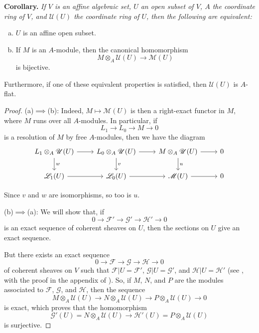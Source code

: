 \documentclass{article}
\newenvironment{itenv}[1]
  {\phantomsection\par\medskip\noindent\textbf{#1.}\itshape}
  {\medskip}
\newcommand{\scr}[1]{{\mathscr{#1}}}
\newcommand{\oldpage}[1]{\marginpar{\footnotesize$\Big\vert$ \textit{p.~#1}}}
\begin{document}
\begin{itenv}{Corollary}
  If $V$ is an affine algebraic set, $U$ an open subset of $V$, $A$ the coordinate ring of $V$, and $\scr{U}(U)$ the coordinate ring of $U$, then the following are equivalent:
  \begin{enumerate}[(a)]
    \item $U$ is an affine open subset.
    \item If $M$ is an $A$-module, then the canonical homomorphism
      \[
        M\otimes_A\scr{U}(U) \to \scr{M}(U)
      \]
      is bijective.
  \end{enumerate}

\oldpage{2-08}
  Furthermore, if one of these equivalent properties is satisfied, then $\scr{U}(U)$ is $A$-flat.
\end{itenv}

\begin{proof}
  (a)$\implies$(b):
  Indeed, $M\mapsto\scr{M}(U)$ is then a right-exact functor in $M$, where $M$ runs over all $A$-modules.
  In particular, if
  \[
    L_1 \to L_0 \to M \to 0
  \]
  is a resolution of $M$ by free $A$-modules, then we have the diagram
  \[
    \begin{tikzcd}
      L_1\otimes_A\scr{U}(U) \rar \dar["w"]
      & L_0\otimes_A\scr{U}(U) \rar \dar["v"]
      & M\otimes_A\scr{U}(U) \rar \dar["u"]
      & 0
    \\\scr{L}_1(U) \rar
      & \scr{L}_0(U) \rar
      & \scr{M}(U) \rar
      & 0
    \end{tikzcd}
  \]

  Since $v$ and $w$ are isomorphisms, so too is $u$.

  \bigskip
  (b)$\implies$(a):
  We will show that, if
  \[
    0 \to \scr{F}' \to\scr{G}' \to \scr{H}' \to 0
  \]
  is an exact sequence of coherent sheaves on $U$, then the sections on $U$ give an exact sequence.

  But there exists an exact sequence
  \[
    0 \to \scr{F} \to \scr{G} \to \scr{H} \to 0
  \]
  of coherent sheaves on $V$ such that $\scr{F}|U=\scr{F}'$, $\scr{G}|U=\scr{G}'$, and $\scr{H}|U=\scr{H}'$ (see \cite{1}, with the proof in the appendix of \cite{2}).
  So, if $M$, $N$, and $P$ are the modules associated to $\scr{F}$, $\scr{G}$, and $\scr{H}$, then the sequence
  \[
    M\otimes_A\scr{U}(U) \to N\otimes_A\scr{U}(U) \to P\otimes_A\scr{U}(U) \to 0
  \]
  is exact, which proves that the homomorphism
  \[
    \scr{G}'(U) = N\otimes_A\scr{U}(U) \to \scr{H}'(U) = P\otimes_A\scr{U}(U)
  \]
  is surjective.
\end{proof}
\end{document}
